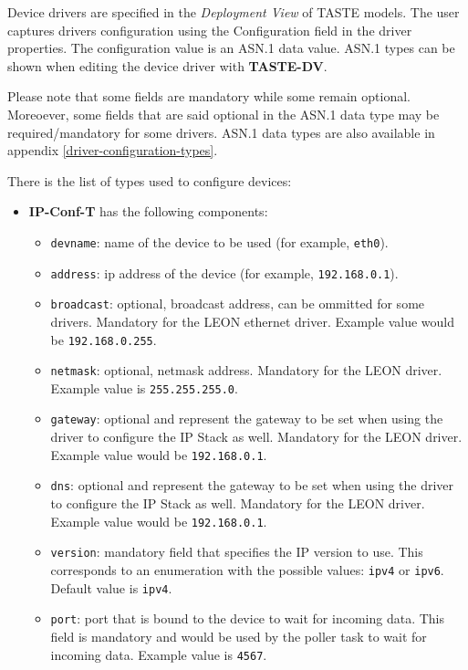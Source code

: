 \documentclass[11pt]{book}
\begin{document}
   Device drivers are specified in the \textit{Deployment View} of TASTE models. The user
   captures drivers configuration using the Configuration field in the driver
   properties. The configuration value is an ASN.1 data value. ASN.1 types can
   be shown when editing the device driver with \textbf{TASTE-DV}.

   Please note that some fields are mandatory while some remain optional.
   Moreoever, some fields that are said optional in the ASN.1 data type may be
   required/mandatory for some drivers. ASN.1 data types are also available in
   appendix \ref{driver-configuration-types}.
   
   There is the list of types used to configure devices:
   \begin{itemize}
      \item
         \textbf{IP-Conf-T} has the following components:
         \begin{itemize}
            \item
               \texttt{devname}: name of the device to be used (for example,
               \texttt{eth0}).
            \item
               \texttt{address}: ip address of the device (for example,
               \texttt{192.168.0.1}).
            \item
               \texttt{broadcast}: optional, broadcast address, can be ommitted
               for some drivers. Mandatory for the LEON ethernet driver. Example
               value would be \texttt{192.168.0.255}.
            \item
               \texttt{netmask}: optional, netmask address. Mandatory for the
               LEON driver. Example value is \texttt{255.255.255.0}.
            \item
               \texttt{gateway}: optional and represent the gateway to be set
               when using the driver to configure the IP Stack as well.
               Mandatory for the LEON driver. Example value would be
               \texttt{192.168.0.1}.
            \item
               \texttt{dns}: optional and represent the gateway to be set
               when using the driver to configure the IP Stack as well.
               Mandatory for the LEON driver. Example value would be
               \texttt{192.168.0.1}.
            \item
               \texttt{version}: mandatory field that specifies the IP version
               to use. This corresponds to an enumeration with the possible
               values: \texttt{ipv4} or \texttt{ipv6}. Default value is
               \texttt{ipv4}.
            \item
               \texttt{port}: port that is bound to the device to wait for
               incoming data. This field is mandatory and would be used by the
               poller task to wait for incoming data. Example value is
               \texttt{4567}.
         \end{itemize}



\end{itemize}
\end{document}
